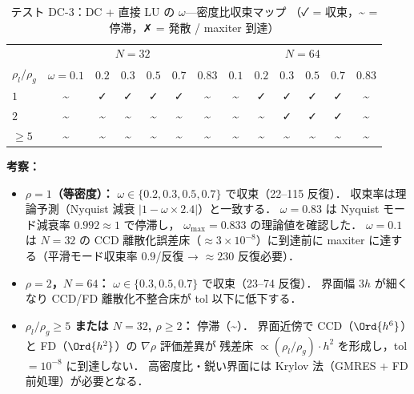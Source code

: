 \begin{table}[htbp]
\centering
\small
\caption{テスト DC-3：DC + 直接 LU の $\omega$---密度比収束マップ
（✓ = 収束，\textasciitilde{} = 停滞，✗ = 発散 / maxiter 到達）}
\label{tab:dc_omega_map}
\renewcommand{\arraystretch}{1.2}
\begin{tabular}{lcccccc|cccccc}
\toprule
& \multicolumn{6}{c|}{$N = 32$} & \multicolumn{6}{c}{$N = 64$} \\
$\rho_l/\rho_g$ & $\omega=0.1$ & $0.2$ & $0.3$ & $0.5$ & $0.7$ & $0.83$
               & $0.1$ & $0.2$ & $0.3$ & $0.5$ & $0.7$ & $0.83$ \\
\midrule
$1$    & \textasciitilde & ✓ & ✓ & ✓ & ✓ & \textasciitilde
        & \textasciitilde & ✓ & ✓ & ✓ & ✓ & \textasciitilde \\
$2$    & \textasciitilde & \textasciitilde & \textasciitilde & \textasciitilde & \textasciitilde & \textasciitilde
        & \textasciitilde & \textasciitilde & ✓ & ✓ & ✓ & \textasciitilde \\
$\ge 5$ & \textasciitilde & \textasciitilde & \textasciitilde & \textasciitilde & \textasciitilde & \textasciitilde
         & \textasciitilde & \textasciitilde & \textasciitilde & \textasciitilde & \textasciitilde & \textasciitilde \\
\bottomrule
\end{tabular}
\end{table}

\noindent\textbf{考察：}
\begin{itemize}[noitemsep]
  \item \textbf{$\rho = 1$（等密度）：} $\omega \in \{0.2, 0.3, 0.5, 0.7\}$ で収束（22--115 反復）．
        収束率は理論予測（Nyquist 減衰 $|1 - \omega \times 2.4|$）と一致する．
        $\omega = 0.83$ は Nyquist モード減衰率 $0.992 \approx 1$ で停滞し，
        $\omega_{\max} = 0.833$ の理論値を確認した．
        $\omega = 0.1$ は $N=32$ の CCD 離散化誤差床（$\approx 3\times10^{-8}$）に到達前に
        maxiter に達する（平滑モード収束率 $0.9$/反復 → $\approx 230$ 反復必要）．
  \item \textbf{$\rho = 2$，$N = 64$：} $\omega \in \{0.3, 0.5, 0.7\}$ で収束（23--74 反復）．
        界面幅 $3h$ が細くなり CCD/FD 離散化不整合床が tol 以下に低下する．
  \item \textbf{$\rho_l/\rho_g \ge 5$ または $N=32$, $\rho \ge 2$：} 停滞（\textasciitilde）．
        界面近傍で CCD（$\Ord{h^6}$）と FD（$\Ord{h^2}$）の $\nabla\rho$ 評価差異が
        残差床 $\propto (\rho_l/\rho_g)\cdot h^2$ を形成し，tol $= 10^{-8}$ に到達しない．
        高密度比・鋭い界面には Krylov 法（GMRES + FD 前処理）が必要となる．
\end{itemize}

